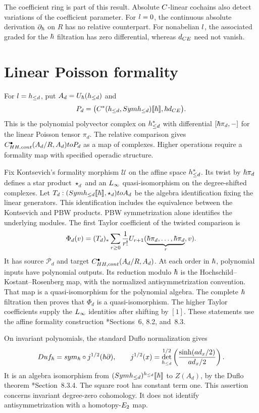 The coefficient ring is part of this result.
Absolute $C$-linear cochains also detect variations of the coefficient parameter.
For $l=0$, the continuous absolute derivation $\partial_{\hbar}$
on $R$ has no relative counterpart.
For nonabelian $l$, the associated graded for the $\hbar$ filtration
has zero differential, whereas $d_{CE}$ need not vanish.

\section{Linear Poisson formality}
For $l=h_{\le d}$, put $A_d=U_\hbar(h_{\le d})$ and
\[
 P_d=
 \bigl(C^*(h_{\le d},Symh_{\le d})
       \llbracket\hbar\rrbracket,\hbar d_{CE}\bigr).
\]
This is the polynomial polyvector complex on $h_{\le d}^*$ with
differential $[\hbar\pi_d,-]$ for the linear Poisson tensor $\pi_d$.
The relative comparison gives $C^\bullet_{HH,cont}(A_d/R,A_d)
toP_d$ as a map of complexes.
Higher operations require a formality map with specified operadic structure.

Fix Kontsevich's formality morphism $\mathcal U$ on the affine space
$h_{\le d}^*$.
Its twist by $\hbar\pi_d$ defines a star product $\star_d$ and an
$L_\infty$ quasi-isomorphism on the degree-shifted complexes.
Let $T_d:(Symh_{\le d}\llbracket\hbar\rrbracket,\star_d)
to A_d$ be the algebra identification fixing the linear generators.
This identification includes the equivalence between the Kontsevich and PBW products.
PBW symmetrization alone identifies the underlying modules.
The first Taylor coefficient of the twisted comparison is
\[
 \Phi_d(v)=(T_d)_*
 \sum_{r\ge0}\frac1{r!}
 U_{r+1}
 (\underbrace{\hbar\pi_d,\ldots,\hbar\pi_d}_{r},v).
\]
It has source $\mathcal P_d$ and target
$C^\bullet_{HH,cont}(A_d/R,A_d)$.
At each order in $\hbar$, polynomial inputs have polynomial outputs.
Its reduction modulo $\hbar$ is the Hochschild--Kostant--Rosenberg map,
with the normalized antisymmetrization convention.
That map is a quasi-isomorphism for the polynomial algebra.
The complete $\hbar$ filtration then proves that $\Phi_d$ is a quasi-isomorphism.
The higher Taylor coefficients supply the $L_\infty$ identities after shifting by $[1]$.
These statements use the affine formality construction
\cite{KontsevichDQ}*{Sections~6, 8.2, and~8.3}.

On invariant polynomials, the standard Duflo normalization gives
\[
 Duf_\hbar
 =sym_\hbar\circ j^{1/2}(\hbar\partial),
 \qquad
 j^{1/2}(x)=
 \det_{h_{\le d}}^{1/2}
 \left(\frac{\sinh(ad_x/2)}
 {ad_x/2}\right).
\]
It is an algebra isomorphism from
$(Symh_{\le d})^{h_{\le d}}\llbracket\hbar\rrbracket$
to $Z(A_d)$, by the Duflo theorem
\cite{KontsevichDQ}*{Section~8.3.4}.
The square root has constant term one.
This assertion concerns invariant degree-zero cohomology.
It does not identify antisymmetrization with a homotopy-$E_2$ map.

